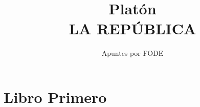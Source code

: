 \documentclass[10pt]{book}
\begin{document}
\normalfont

\author{\Large Apuntes por FODE}
\title{\small Platón \\ \vspace{1cm} \large LA REPÚBLICA}
\date{}
\pagestyle{empty}
\maketitle
\thispagestyle{empty}
\let\cleardoublepage\clearpage
\tableofcontents								%


 
\let\cleardoublepage\clearpage

\chapter*{Libro Primero}
\end{document}
